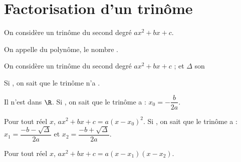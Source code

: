 
\section{Factorisation d'un trinôme}

\begin{Definition}[Discriminant]
    On considère un trinôme du second degré $ax^2+bx+c$.

    On appelle du polynôme, le nombre . 
\end{Definition}
\begin{Propriete}
On considère un trinôme du second degré $ax^2+bx+c$ ; et $\Delta$ son 
\begin{tcbenumerate}
\tcbitem  Si , on sait que le trinôme n'a . 

Il n'est  dans $\R$.
\tcbitem  Si , on sait que le trinôme a  : $x_0=-\dfrac{b}{2a}$. 

Pour tout réel $x$, $ax^2+bx+c=a(x-x_0)^2$.
\tcbitem  Si , on sait que le trinôme a  : $x_1=\dfrac{-b-\sqrt{\Delta}}{2a} $ \hspace*{1mm}et\hspace*{1mm} $x_2=\dfrac{-b+\sqrt{\Delta}}{2a}$. 

Pour tout réel $x$, $ax^2+bx+c=a(x-x_1)(x-x_2)$.
\end{tcbenumerate}
\end{Propriete}

